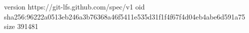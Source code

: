 version https://git-lfs.github.com/spec/v1
oid sha256:96222a0513eb246a3b76368a46f5411e535d31f1f4f67f4d04eb4abe6d591a75
size 391481
